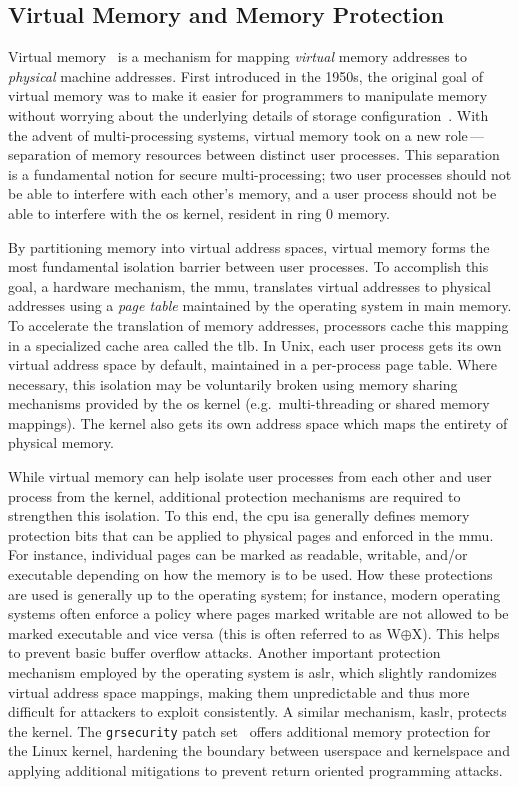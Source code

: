 \subsection{Virtual Memory and Memory Protection}%
\label{ss:virtual-memory}

Virtual memory~\cite{denning1970_virtual} is a mechanism for mapping \textit{virtual}
memory addresses to \textit{physical} machine addresses. First introduced in the 1950s,
the original goal of virtual memory was to make it easier for programmers to manipulate
memory without worrying about the underlying details of storage
configuration~\cite{denning1970_virtual}. With the advent of multi-processing systems,
virtual memory took on a new role\,---\,separation of memory resources between distinct
user processes. This separation is a fundamental notion for secure multi-processing; two
user processes should not be able to interfere with each other's memory, and a user
process should not be able to interfere with the \gls{os} kernel, resident in ring
0 memory.

By partitioning memory into virtual address spaces, virtual memory forms the most
fundamental isolation barrier between user processes. To accomplish this goal, a hardware
mechanism, the \gls{mmu}, translates virtual addresses to physical addresses using
a \textit{page table} maintained by the operating system in main memory. To accelerate the
translation of memory addresses, processors cache this mapping in a specialized
cache area called the \gls{tlb}.  In Unix, each user process gets its own virtual address
space by default, maintained in a per-process page table. Where necessary, this isolation
may be voluntarily broken using memory sharing mechanisms provided by the \gls{os} kernel
(e.g.\ multi-threading or shared memory mappings). The kernel also gets its own address
space which maps the entirety of physical memory.

While virtual memory can help isolate user processes from each other and user process from
the kernel, additional protection mechanisms are required to strengthen this isolation. To
this end, the \gls{cpu} \gls{isa} generally defines memory protection bits that can be applied
to physical pages and enforced in the \gls{mmu}. For instance, individual pages can be
marked as readable, writable, and/or executable depending on how the memory is to be used.
How these protections are used is generally up to the operating system; for instance,
modern operating systems often enforce a policy where pages marked writable are not
allowed to be marked executable and vice versa (this is often referred to as W$\oplus$X).
This helps to prevent basic buffer overflow attacks. Another important
protection mechanism employed by the operating system is \gls{aslr}, which slightly
randomizes virtual address space mappings, making them unpredictable and thus more difficult for
attackers to exploit consistently. A similar mechanism, \gls{kaslr}, protects the kernel.
The \texttt{grsecurity} patch set~\cite{grsecurity} offers additional memory protection for the
Linux kernel, hardening the boundary between userspace and kernelspace and applying
additional mitigations to prevent return oriented programming attacks.

